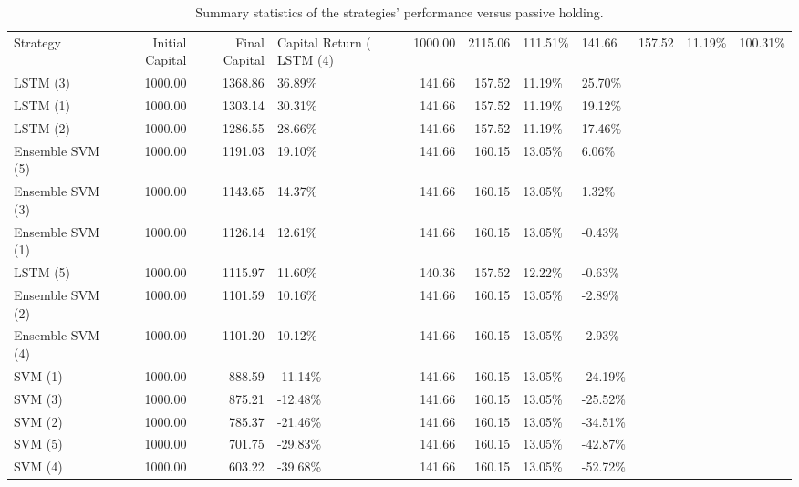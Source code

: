 \begin{table}
\caption{Summary statistics of the strategies' performance versus passive holding.}
\label{tbl:strategy_stats}
\begin{tabular}{lrrlrrll}
\toprule
Strategy & Initial Capital & Final Capital & Capital Return (%
\midrule
LSTM (4) & 1000.00 & 2115.06 & 111.51\% & 141.66 & 157.52 & 11.19\% & 100.31\% \\
LSTM (3) & 1000.00 & 1368.86 & 36.89\% & 141.66 & 157.52 & 11.19\% & 25.70\% \\
LSTM (1) & 1000.00 & 1303.14 & 30.31\% & 141.66 & 157.52 & 11.19\% & 19.12\% \\
LSTM (2) & 1000.00 & 1286.55 & 28.66\% & 141.66 & 157.52 & 11.19\% & 17.46\% \\
Ensemble SVM (5) & 1000.00 & 1191.03 & 19.10\% & 141.66 & 160.15 & 13.05\% & 6.06\% \\
Ensemble SVM (3) & 1000.00 & 1143.65 & 14.37\% & 141.66 & 160.15 & 13.05\% & 1.32\% \\
Ensemble SVM (1) & 1000.00 & 1126.14 & 12.61\% & 141.66 & 160.15 & 13.05\% & -0.43\% \\
LSTM (5) & 1000.00 & 1115.97 & 11.60\% & 140.36 & 157.52 & 12.22\% & -0.63\% \\
Ensemble SVM (2) & 1000.00 & 1101.59 & 10.16\% & 141.66 & 160.15 & 13.05\% & -2.89\% \\
Ensemble SVM (4) & 1000.00 & 1101.20 & 10.12\% & 141.66 & 160.15 & 13.05\% & -2.93\% \\
SVM (1) & 1000.00 & 888.59 & -11.14\% & 141.66 & 160.15 & 13.05\% & -24.19\% \\
SVM (3) & 1000.00 & 875.21 & -12.48\% & 141.66 & 160.15 & 13.05\% & -25.52\% \\
SVM (2) & 1000.00 & 785.37 & -21.46\% & 141.66 & 160.15 & 13.05\% & -34.51\% \\
SVM (5) & 1000.00 & 701.75 & -29.83\% & 141.66 & 160.15 & 13.05\% & -42.87\% \\
SVM (4) & 1000.00 & 603.22 & -39.68\% & 141.66 & 160.15 & 13.05\% & -52.72\% \\
\bottomrule
\end{tabular}
\end{table}
